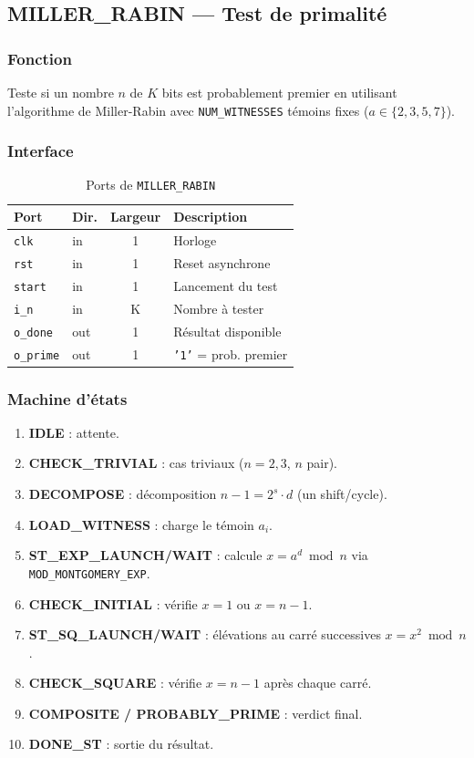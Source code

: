 \documentclass[12pt,a4paper]{report}
\begin{document}
\subsection{MILLER\_RABIN --- Test de primalité}
\label{sec:mr}

\subsubsection{Fonction}
Teste si un nombre $n$ de $K$ bits est probablement premier en utilisant
l'algorithme de Miller-Rabin avec \texttt{NUM\_WITNESSES} témoins
fixes ($a \in \{2, 3, 5, 7\}$).

\subsubsection{Interface}
\begin{table}[H]
\centering
\caption{Ports de \texttt{MILLER\_RABIN}}
\begin{tabular}{llcp{5cm}}
\toprule
\textbf{Port} & \textbf{Dir.} & \textbf{Largeur} & \textbf{Description} \\
\midrule
\texttt{clk}     & in  & 1 & Horloge \\
\texttt{rst}     & in  & 1 & Reset asynchrone \\
\texttt{start}   & in  & 1 & Lancement du test \\
\texttt{i\_n}    & in  & K & Nombre à tester \\
\texttt{o\_done}  & out & 1 & Résultat disponible \\
\texttt{o\_prime} & out & 1 & \texttt{'1'} = prob. premier \\
\bottomrule
\end{tabular}
\end{table}


\subsubsection{Machine d'états}
\begin{enumerate}
  \item \textbf{IDLE} : attente.
  \item \textbf{CHECK\_TRIVIAL} : cas triviaux ($n=2,3$, $n$ pair).
  \item \textbf{DECOMPOSE} : décomposition $n-1 = 2^s \cdot d$ (un shift/cycle).
  \item \textbf{LOAD\_WITNESS} : charge le témoin $a_i$.
  \item \textbf{ST\_EXP\_LAUNCH/WAIT} : calcule $x = a^d \bmod n$ via
        \texttt{MOD\_MONTGOMERY\_EXP}.
  \item \textbf{CHECK\_INITIAL} : vérifie $x = 1$ ou $x = n-1$.
  \item \textbf{ST\_SQ\_LAUNCH/WAIT} : élévations au carré successives
        $x = x^2 \bmod n$.
  \item \textbf{CHECK\_SQUARE} : vérifie $x = n-1$ après chaque carré.
  \item \textbf{COMPOSITE / PROBABLY\_PRIME} : verdict final.
  \item \textbf{DONE\_ST} : sortie du résultat.
\end{enumerate}
\end{document}

